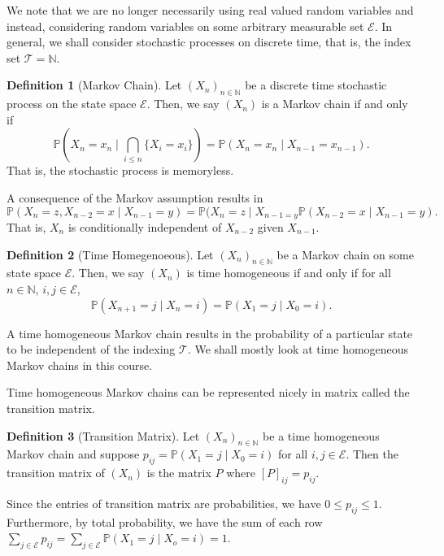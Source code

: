 \documentclass[
]{article}
\theoremstyle{definition}
\newtheorem{definition}{Definition}[section]
\begin{document}
We note that we are no longer necessarily using real valued random
variables and instead, considering random variables on some arbitrary
measurable set \(\mathcal{E}\). In general, we shall consider stochastic
processes on discrete time, that is, the index set
\(\mathcal{T} = \mathbb{N}\).

\begin{definition}[Markov Chain]
  Let \((X_n)_{n \in \mathbb{N}}\) be a discrete time stochastic process on 
  the state space \(\mathcal{E}\). Then, we say \((X_n)\) is a Markov chain if 
  and only if 
  \[\mathbb{P}(X_n = x_n \mid \bigcap_{i \le n} \{X_i = x_i\}) = 
    \mathbb{P}(X_n = x_n \mid X_{n - 1} = x_{n - 1}).\]
  That is, the stochastic process is memoryless.
\end{definition}

A consequence of the Markov assumption results in
\[\mathbb{P}(X_n = z, X_{n - 2} = x \mid X_{n - 1} = y) = 
  \mathbb{P}(X_n = z \mid X_{n - 1 = y}\mathbb{P}(X_{n - 2} = x \mid X_{n - 1} = y).\]
That is, \(X_n\) is conditionally independent of \(X_{n - 2}\) given
\(X_{n - 1}\).

\begin{definition}[Time Homegenoeous]
  Let \((X_n)_{n \in \mathbb{N}}\) be a Markov chain on some state space 
  \(\mathcal{E}\). Then, we say \((X_n)\) is time homogeneous if and only if 
  for all \(n \in \mathbb{N}\), \(i, j \in \mathcal{E}\), 
  \[\mathbb{P}(X_{n + 1} = j \mid X_n = i) = \mathbb{P}(X_1 = j \mid X_0 = i).\]
\end{definition}

A time homogeneous Markov chain results in the probability of a
particular state to be independent of the indexing \(\mathcal{T}\). We
shall mostly look at time homogeneous Markov chains in this course.

Time homogeneous Markov chains can be represented nicely in matrix
called the transition matrix.

\begin{definition}[Transition Matrix]
  Let \((X_n)_{n \in \mathbb{N}}\) be a time homogeneous Markov chain and suppose 
  \(p_{ij} = \mathbb{P}(X_1 = j \mid X_0 = i)\) for all \(i, j \in \mathcal{E}\). 
  Then the transition matrix of \((X_n)\) is the matrix \(P\) where 
  \([P]_{ij} = p_{ij}\).
\end{definition}

Since the entries of transition matrix are probabilities, we have
\(0 \le p_{ij} \le 1\). Furthermore, by total probability, we have the
sum of each row
\(\sum_{j \in \mathcal{E}} p_{ij} =  \sum_{j \in \mathcal{E}} \mathbb{P}(X_1 = j \mid X_o = i) = 1\).
\end{document}
